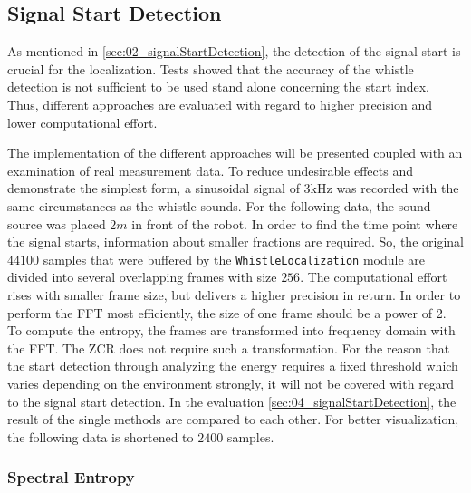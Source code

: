 \subsection{Signal Start Detection}
\label{subsec:03_signalStartDetection}

As mentioned in \cref{sec:02_signalStartDetection}, the detection of the
signal start is crucial for the localization.
Tests showed that the accuracy of the whistle detection is not
sufficient to be used stand alone concerning the start index.
Thus, different approaches are evaluated with regard to higher
precision and lower computational effort.

The implementation of the different approaches will be presented coupled with
an examination of real measurement data.
To reduce undesirable effects and demonstrate the simplest form, a sinusoidal
signal of $3\si{\kilo\hertz}$ was recorded with the same circumstances as the
whistle-sounds.
For the following data, the sound source was placed $2\si{m}$ in front of the robot.
In order to find the time point where the signal starts, information about
smaller fractions are required.
So, the original $44100$ samples that were buffered by the
\lstinline!WhistleLocalization! module are divided into several overlapping
frames with size $256$. The computational effort rises with smaller frame size,
but delivers a higher precision in return.
In order to perform the \ac{FFT} most efficiently, the size of one frame
should be a power of 2.
To compute the entropy, the frames are transformed into
frequency domain with the \ac{FFT}.
The \ac{ZCR} does not require such a transformation.
For the reason that the start detection through analyzing the energy requires a fixed
threshold which varies depending on the environment strongly, it will not be covered
with regard to the signal start detection.
In the evaluation \cref{sec:04_signalStartDetection}, the result of the single
methods are compared to each other.
For better visualization, the following data is shortened to $2400$ samples.

\subsubsection*{Spectral Entropy}

